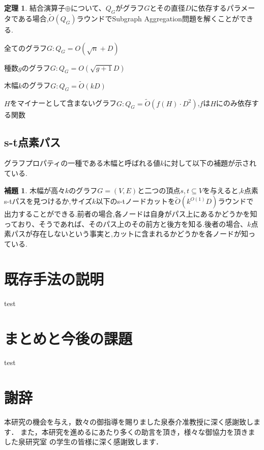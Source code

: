 \documentclass{thesis}
\theoremstyle{definition}
\newtheorem{theorem}{定理}
\newtheorem{lemma}{補題}
\begin{document}
\begin{theorem}
    結合演算子$\oplus$について、$Q_G$がグラフ$G$とその直径$D$に依存するパラメータである場合,$\tilde{O}(Q_G)$ラウンドでSubgraph Aggregation問題を解くことができる.
    \item 全てのグラフ$G:Q_G = O(\sqrt{n}+D)$
    \item 種数$g$のグラフ$G:Q_G=O(\sqrt{g+1}D)$
    \item 木幅$k$のグラフ$G:Q_G=\tilde{O}(kD)$
    \item $H$をマイナーとして含まないグラフ$G:Q_G=\tilde{O}(f(H)\cdot D^2)$,$f$は$H$にのみ依存する関数
\end{theorem}

\section{s-t点素パス}
グラフプロパティの一種である木幅と呼ばれる値$k$に対して以下の補題が示されている.

\begin{lemma}
    木幅が高々$k$のグラフ$G=(V,E)$と二つの頂点$s,t\subseteq V$を与えると,$k$点素s-tパスを見つけるか,サイズ$k$以下のs-tノードカットを$\tilde{O}(k^{O(1)}D)$ラウンドで出力することができる.前者の場合,各ノードは自身がパス上にあるかどうかを知っており、そうであれば、そのパス上のその前方と後方を知る.後者の場合、$k$点素パスが存在しないという事実と,カットに含まれるかどうかを各ノードが知っている.
\end{lemma}



\chapter{既存手法の説明}
test

\chapter{まとめと今後の課題}
test


\chapter{謝辞}
本研究の機会を与え，数々の御指導を賜りました泉泰介准教授に深く感謝致します．
また，本研究を進めるにあたり多くの助言を頂き，様々な御協力を頂きました泉研究室
の学生の皆様に深く感謝致します．




%
\end{document}
